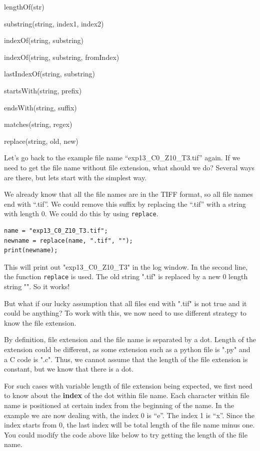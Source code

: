 \documentclass[11pt,a4paper,oneside]{report}
\newenvironment{indentCom}
{\begin{list}{}
         {\setlength{\leftmargin}{1em}}
         \item[]
}
{\end{list}}
\newcommand{\ilcom}[1]{\texttt{\small#1}}
\begin{document}
\begin{shaded}\begin{indentCom}
\item lengthOf(str)
\item substring(string, index1, index2)
\item indexOf(string, substring)
\item indexOf(string, substring, fromIndex)
\item lastIndexOf(string, substring)
\item startsWith(string, prefix)
\item endsWith(string, suffix)
\item matches(string, regex)
\item replace(string, old, new)
\end{indentCom}\end{shaded}

Let's go back to the example file name ``exp13\_C0\_Z10\_T3.tif'' again. If we need to get the file name without file extension, what should we do? Several ways are there, but lets start with the simplest way. 

We already know that all the file names are in the TIFF format, so all file names end with ``.tif''.  We could remove this suffix by replacing the ``.tif'' with a string with length 0. We could do this by using \ilcom{replace}. 

\begin{lstlisting}
name = "exp13_C0_Z10_T3.tif";
newname = replace(name, ".tif", "");
print(newname);
\end{lstlisting}

This will print out "exp13\_C0\_Z10\_T3" in the log window. In the second line, the function \ilcom{replace} is used. The old string ".tif" is replaced by a new 0 length string "". So it works! 

But what if our lucky assumption that all files end with ".tif" is not true and it could be anything? To work with this, we now need to use different strategy to know the file extension. 

By definition, file extension and the file name is separated by a dot. Length of the extension could be different, as some extension such as a python file is ".py" and a C code is ".c". Thus, we cannot assume that the length of the file extension is constant, but we know that there is a dot. 

For such cases with variable length of file extension being expected, we first need to know about the \textbf{index} of the dot within file name. Each character within file name is positioned at certain index from the beginning of the name. In the example we are now dealing with, the index 0 is ``e''. The index 1 is ``x''. Since the index starts from 0, the last index will be total length of the file name minus one. You could modify the code above like below to try getting the length of the file name. 
\end{document}
